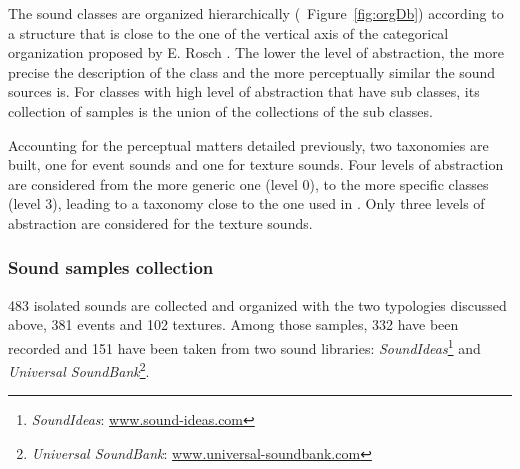 \documentclass[twoside,twocolumn]{article}
\begin{document}
The sound classes are organized hierarchically (\cf~Figure~\ref{fig:orgDb}) according to a structure that is close to the one of the vertical axis of the categorical organization proposed by E. Rosch \cite{rosch1978cognition}. The lower the level of abstraction, the more precise the description of the class and the more perceptually similar the sound sources is. For classes with high level of abstraction that have sub classes, its collection of samples is the union of the collections of the sub classes.


Accounting for the perceptual matters detailed previously, two taxonomies are built, one for event sounds and one for texture sounds. Four levels of abstraction are considered from the more generic one (level 0), to the more specific classes (level 3), leading to a taxonomy close to the one used in \cite{Salamon14}. Only three levels of abstraction are considered for the texture sounds.

\subsubsection*{Sound samples collection}


483 isolated sounds are collected and organized with the two typologies discussed above, 381 events and 102 textures. Among those samples, 332 have been recorded and 151 have been taken from two sound libraries: \emph{SoundIdeas}\footnote{\emph{SoundIdeas}: \url{www.sound-ideas.com}} and \emph{Universal SoundBank}\footnote{\emph{Universal SoundBank}: \url{www.universal-soundbank.com}}.
\end{document}

